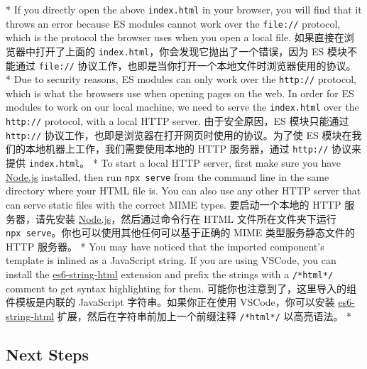\begin{paracol}{2}
\switchcolumn[0]*%
If you directly open the above \texttt{index.html} in your browser, you
will find that it throws an error because ES modules cannot work over
the \texttt{file://} protocol, which is the protocol the browser uses
when you open a local file.
\switchcolumn
如果直接在浏览器中打开了上面的
\texttt{index.html}，你会发现它抛出了一个错误，因为 ES 模块不能通过
\texttt{file://}
协议工作，也即是当你打开一个本地文件时浏览器使用的协议。
\switchcolumn[0]*%
Due to security reasons, ES modules can only work over the
\texttt{http://} protocol, which is what the browsers use when opening
pages on the web. In order for ES modules to work on our local machine,
we need to serve the \texttt{index.html} over the \texttt{http://}
protocol, with a local HTTP server.
\switchcolumn
由于安全原因，ES 模块只能通过 \texttt{http://}
协议工作，也即是浏览器在打开网页时使用的协议。为了使 ES
模块在我们的本地机器上工作，我们需要使用本地的 HTTP 服务器，通过
\texttt{http://} 协议来提供 \texttt{index.html}。
\switchcolumn[0]*%
To start a local HTTP server, first make sure you have
\href{https://nodejs.org/en/}{Node.js} installed, then run
\texttt{npx\ serve} from the command line in the same directory where
your HTML file is. You can also use any other HTTP server that can serve
static files with the correct MIME types.
\switchcolumn
要启动一个本地的 HTTP 服务器，请先安装
\href{https://nodejs.org/zh/}{Node.js}，然后通过命令行在 HTML
文件所在文件夹下运行
\texttt{npx\ serve}。你也可以使用其他任何可以基于正确的 MIME
类型服务静态文件的 HTTP 服务器。
\switchcolumn[0]*%
You may have noticed that the imported component's template is inlined
as a JavaScript string. If you are using VSCode, you can install the
\href{https://marketplace.visualstudio.com/items?itemName=Tobermory.es6-string-html}{es6-string-html}
extension and prefix the strings with a \texttt{/*html*/} comment to get
syntax highlighting for them.
\switchcolumn
可能你也注意到了，这里导入的组件模板是内联的 JavaScript
字符串。如果你正在使用 VSCode，你可以安装
\href{https://marketplace.visualstudio.com/items?itemName=Tobermory.es6-string-html}{es6-string-html}
扩展，然后在字符串前加上一个前缀注释 \texttt{/*html*/} 以高亮语法。
\switchcolumn[0]*%
\subsection{Next Steps}
\switchcolumn

\end{paracol}
